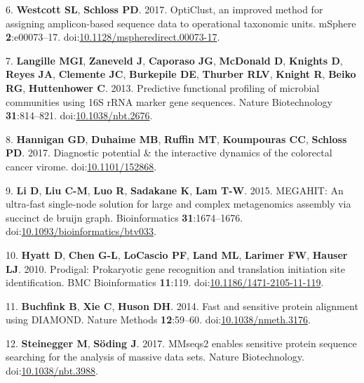 \documentclass[11pt,]{article}
\begin{document}
\hypertarget{ref-opticlust_westcott2017}{}
6. \textbf{Westcott SL}, \textbf{Schloss PD}. 2017. OptiClust, an
improved method for assigning amplicon-based sequence data to
operational taxonomic units. mSphere \textbf{2}:e00073--17.
doi:\href{https://doi.org/10.1128/mspheredirect.00073-17}{10.1128/mspheredirect.00073-17}.

\hypertarget{ref-Langille2013}{}
7. \textbf{Langille MGI}, \textbf{Zaneveld J}, \textbf{Caporaso JG},
\textbf{McDonald D}, \textbf{Knights D}, \textbf{Reyes JA},
\textbf{Clemente JC}, \textbf{Burkepile DE}, \textbf{Thurber RLV},
\textbf{Knight R}, \textbf{Beiko RG}, \textbf{Huttenhower C}. 2013.
Predictive functional profiling of microbial communities using 16S rRNA
marker gene sequences. Nature Biotechnology \textbf{31}:814--821.
doi:\href{https://doi.org/10.1038/nbt.2676}{10.1038/nbt.2676}.

\hypertarget{ref-Hannigan2017}{}
8. \textbf{Hannigan GD}, \textbf{Duhaime MB}, \textbf{Ruffin MT},
\textbf{Koumpouras CC}, \textbf{Schloss PD}. 2017. Diagnostic potential
\& the interactive dynamics of the colorectal cancer virome.
doi:\href{https://doi.org/10.1101/152868}{10.1101/152868}.

\hypertarget{ref-Li2015}{}
9. \textbf{Li D}, \textbf{Liu C-M}, \textbf{Luo R}, \textbf{Sadakane K},
\textbf{Lam T-W}. 2015. MEGAHIT: An ultra-fast single-node solution for
large and complex metagenomics assembly via succinct de bruijn graph.
Bioinformatics \textbf{31}:1674--1676.
doi:\href{https://doi.org/10.1093/bioinformatics/btv033}{10.1093/bioinformatics/btv033}.

\hypertarget{ref-Hyatt2010}{}
10. \textbf{Hyatt D}, \textbf{Chen G-L}, \textbf{LoCascio PF},
\textbf{Land ML}, \textbf{Larimer FW}, \textbf{Hauser LJ}. 2010.
Prodigal: Prokaryotic gene recognition and translation initiation site
identification. BMC Bioinformatics \textbf{11}:119.
doi:\href{https://doi.org/10.1186/1471-2105-11-119}{10.1186/1471-2105-11-119}.

\hypertarget{ref-Buchfink2014}{}
11. \textbf{Buchfink B}, \textbf{Xie C}, \textbf{Huson DH}. 2014. Fast
and sensitive protein alignment using DIAMOND. Nature Methods
\textbf{12}:59--60.
doi:\href{https://doi.org/10.1038/nmeth.3176}{10.1038/nmeth.3176}.

\hypertarget{ref-Steinegger2017}{}
12. \textbf{Steinegger M}, \textbf{Söding J}. 2017. MMseqs2 enables
sensitive protein sequence searching for the analysis of massive data
sets. Nature Biotechnology.
doi:\href{https://doi.org/10.1038/nbt.3988}{10.1038/nbt.3988}.
\end{document}
